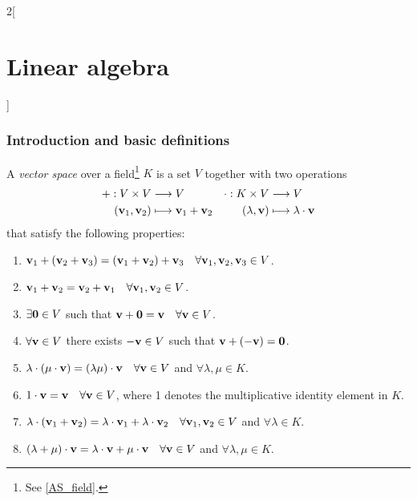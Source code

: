 \documentclass[../../../main.tex]{subfiles}
\begin{document}
\begin{multicols}{2}[\section{Linear algebra}]
  \subsubsection{Introduction and basic definitions}
  \begin{definition}
    A \emph{vector space} over a field\footnote{See \cref{AS_field}.} $K$ is a set $V$ together with two operations
    \begin{align*}
      +:V\times V                                 & \longrightarrow V                                      & \cdot:K\times V              & \longrightarrow V                           \\
      (\boldsymbol{\mathrm{v}}_1,\boldsymbol{\mathrm{v}}_2) & \longmapsto \boldsymbol{\mathrm{v}}_1+ \boldsymbol{\mathrm{v}}_2 & (\lambda,\boldsymbol{\mathrm{v}}) & \longmapsto \lambda\cdot \boldsymbol{\mathrm{v}}
    \end{align*}
    that satisfy the following properties:
    \begin{enumerate}
      \item $\boldsymbol{\mathrm{v}}_1+(\boldsymbol{\mathrm{v}}_2+\boldsymbol{\mathrm{v}}_3)=(\boldsymbol{\mathrm{v}}_1+\boldsymbol{\mathrm{v}}_2)+\boldsymbol{\mathrm{v}}_3\quad\forall\boldsymbol{\mathrm{v}}_1,\boldsymbol{\mathrm{v}}_2,\boldsymbol{\mathrm{v}}_3\in V$.
      \item $\boldsymbol{\mathrm{v}}_1+\boldsymbol{\mathrm{v}}_2=\boldsymbol{\mathrm{v}}_2+\boldsymbol{\mathrm{v}}_1\quad\forall\boldsymbol{\mathrm{v}}_1,\boldsymbol{\mathrm{v}}_2\in V$.
      \item $\exists\boldsymbol{\mathrm{0}}\in V$ such that $\boldsymbol{\mathrm{v}}+\boldsymbol{\mathrm{0}}=\boldsymbol{\mathrm{v}}\quad\forall\boldsymbol{\mathrm{v}}\in V$.
      \item $\forall\boldsymbol{\mathrm{v}}\in V$ there exists $-\boldsymbol{\mathrm{v}}\in V$ such that $\boldsymbol{\mathrm{v}}+(-\boldsymbol{\mathrm{v}})=\boldsymbol{\mathrm{0}}$.
      \item $\lambda\cdot(\mu\cdot\boldsymbol{\mathrm{v}})=(\lambda\mu)\cdot\boldsymbol{\mathrm{v}}\quad\forall\boldsymbol{\mathrm{v}}\in V$ and $\forall\lambda,\mu\in K$.
      \item $1\cdot\boldsymbol{\mathrm{v}}=\boldsymbol{\mathrm{v}}\quad\forall\boldsymbol{\mathrm{v}}\in V$, where 1 denotes the multiplicative identity element in $K$.
      \item $\lambda\cdot(\boldsymbol{\mathrm{v}}_1+\boldsymbol{\mathrm{v}}_2)=\lambda\cdot\boldsymbol{\mathrm{v}}_1+\lambda\cdot\boldsymbol{\mathrm{v}}_2\quad\forall\boldsymbol{\mathrm{v}}_1,\boldsymbol{\mathrm{v}}_2\in V$ and $\forall\lambda\in K$.
      \item $(\lambda+\mu)\cdot\boldsymbol{\mathrm{v}}=\lambda\cdot\boldsymbol{\mathrm{v}}+\mu\cdot\boldsymbol{\mathrm{v}}\quad\forall\boldsymbol{\mathrm{v}}\in V$ and $\forall\lambda,\mu\in K$.

\end{enumerate}
\end{definition}
\end{multicols}
\end{document}
